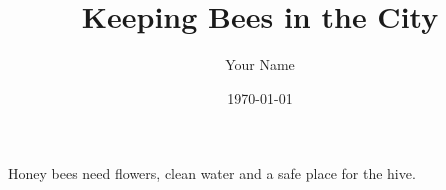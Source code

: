 \documentclass{beamer}
\title{Keeping Bees in the City}
\author{Your Name}
\date{\today}
\begin{document}
\begin{frame}
\maketitle
\end{frame}

\begin{frame}
Honey bees need flowers, clean water and a safe place for the hive.
\end{frame}
\end{document}
